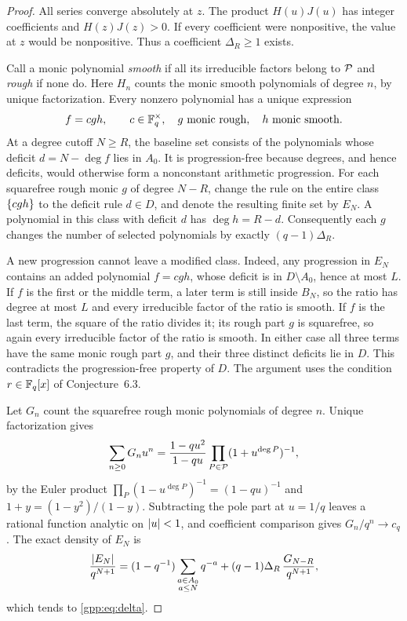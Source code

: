 \begin{proof}
All series converge absolutely at $z$. The product $H(u)J(u)$ has integer coefficients and
$H(z)J(z)>0$. If every coefficient were nonpositive, the value at $z$ would be
nonpositive. Thus a coefficient $\Delta_R\ge1$ exists.

Call a monic polynomial \emph{smooth} if all its irreducible factors belong to $\mathcal{P}$
and \emph{rough} if none do. Here $H_n$ counts the monic smooth polynomials of degree $n$,
by unique factorization. Every nonzero polynomial has a unique expression
\[
 f=cgh,\qquad c\in\mathbb{F}_q^\times,\quad g\text{ monic rough},\quad h\text{ monic smooth}.
\]
At a degree cutoff $N\ge R$, the baseline set consists of the polynomials whose deficit
$d=N-\deg f$ lies in $A_0$. It is progression-free because degrees, and hence deficits,
would otherwise form a nonconstant arithmetic progression. For each squarefree rough monic
$g$ of degree $N-R$, change the rule on the entire class $\{cgh\}$ to the deficit rule
$d\in D$, and denote the resulting finite set by $E_N$. A polynomial in this class with
deficit $d$ has $\deg h=R-d$. Consequently each $g$ changes the number of selected
polynomials by exactly $(q-1)\Delta_R$.

A new progression cannot leave a modified class. Indeed, any progression in $E_N$
contains an added polynomial $f=cgh$, whose deficit is in $D\setminus A_0$, hence at most
$L$. If $f$ is the first or the middle term, a later term is still inside $B_N$, so the
ratio has degree at most $L$ and every irreducible factor of the ratio is smooth. If $f$
is the last term, the square of the ratio divides it; its rough part $g$ is squarefree,
so again every irreducible factor of the ratio is smooth. In either case all three terms
have the same monic rough part $g$, and their three distinct deficits lie in $D$. This
contradicts the progression-free property of $D$. The argument uses the condition
$r\in\mathbb{F}_q[x]$ of Conjecture~6.3.

Let $G_n$ count the squarefree rough monic polynomials of degree $n$. Unique factorization
gives
\[
 \sum_{n\ge0}G_nu^n=\frac{1-qu^2}{1-qu}\prod_{P\in\mathcal{P}}(1+u^{\deg P})^{-1},
\]
by the Euler product $\prod_P(1-u^{\deg P})^{-1}=(1-qu)^{-1}$ and
$1+y=(1-y^2)/(1-y)$. Subtracting the pole part at $u=1/q$ leaves a rational function
analytic on $\lvert u\rvert<1$, and coefficient comparison gives $G_n/q^n\to c_q$. The exact
density of $E_N$ is
\[
 \frac{\lvert E_N\rvert}{q^{N+1}}
  =(1-q^{-1})\sum_{\substack{a\in A_0\\a\le N}}q^{-a}
      +(q-1)\Delta_R\,\frac{G_{N-R}}{q^{N+1}},
\]
which tends to \eqref{gpp:eq:delta}.


\end{proof}

